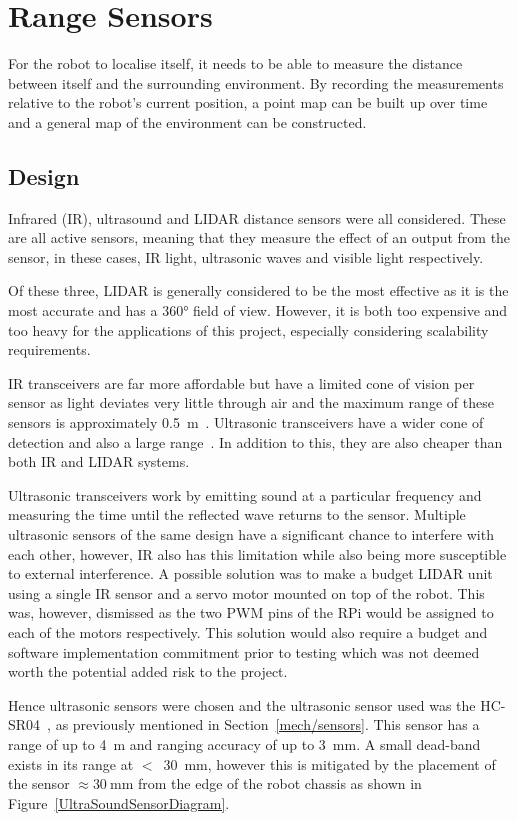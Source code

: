 \section{Range Sensors}\label{elec/range}
For the robot to localise itself, it needs to be able to measure the
distance between itself and the surrounding environment. By recording
the measurements relative to the robot's current position, a point map
can be built up over time and a general map of the environment can be
constructed.

\subsection{Design}\label{elec/range/design}
Infrared (IR), ultrasound and LIDAR distance sensors were all considered. These
are all active sensors, meaning that they measure the effect of an
output from the sensor, in these cases, IR light, ultrasonic waves
and visible light respectively.

Of these three, LIDAR is generally considered to be the most effective
as it is the most accurate and has a \ang{360} field of view. However,
it is both too expensive and too heavy for the applications of this project, especially
considering scalability requirements.

IR transceivers are far more affordable but have a limited cone of
vision per sensor as light deviates very little through air and the
maximum range of these sensors is approximately \SI{0.5}{\m}~\cite{InfraredDatasheet}.
Ultrasonic transceivers have a wider cone of
detection and also a large range~\cite{HCSR04datasheet}. In addition to
this, they are also cheaper than both IR and LIDAR systems.

Ultrasonic transceivers work by emitting sound at a particular frequency
and measuring the time until the reflected wave returns to the sensor.
Multiple ultrasonic sensors of the same design have a significant chance to interfere with each other,
however, IR also has this limitation
while also being more susceptible to external interference. A possible solution
was to make a budget LIDAR unit using a single IR sensor and a
servo motor mounted on top of the robot. This was, however, dismissed as
the two PWM pins of the RPi would be assigned to each of the
motors respectively. This solution would also require a budget and
software implementation commitment prior to testing which was not deemed
worth the potential added risk to the project.

Hence ultrasonic sensors were chosen and the ultrasonic sensor used was
the HC-SR04~\cite{HCSR04datasheet}, as previously mentioned in Section~\ref{mech/sensors}. This sensor has a range of up to \SI{4}{\m} and
ranging accuracy of up to \SI{3}{\mm}. A small dead-band exists in its
range at $<$~\SI{30}{\mm}, however this is mitigated by the placement of
the sensor $\approx{\SI{30}{\mm}}$ from the edge of the robot chassis as shown in Figure~\ref{UltraSoundSensorDiagram}.

